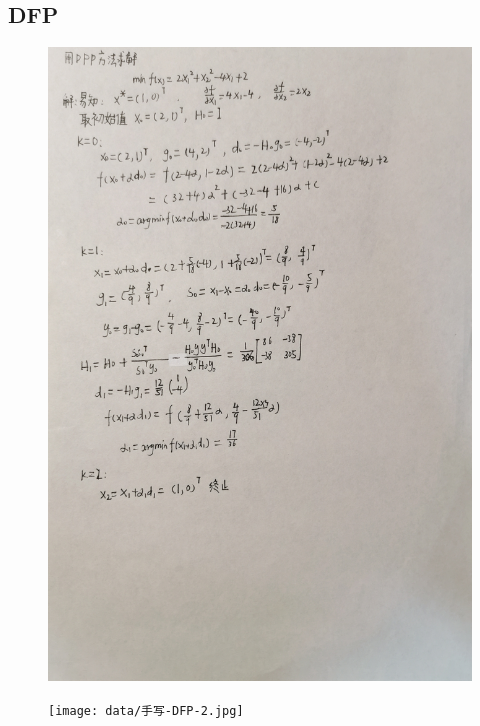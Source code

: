 \subsection{DFP}
\begin{figure}[htbp]
    \centering
    \includegraphics[width = \textwidth]{data/手写-DFP-1.jpg}
\end{figure}
\begin{figure}[htbp]
    \centering
    \texttt{[image: data/手写-DFP-2.jpg]}
\end{figure}